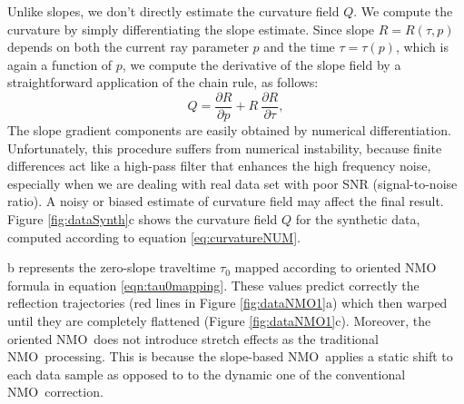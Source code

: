 Unlike slopes, we don't directly estimate the curvature field $Q$.  We
compute the curvature by simply differentiating the slope
estimate. Since slope $R=R(\tau ,p)$ depends on both the current ray
parameter $p$ and the time $\tau =\tau (p)$, which is again a function
of $p$, we compute the derivative of the slope field by a
straightforward application of the chain rule, as follows:
\begin{equation}
Q=\frac{\partial R}{\partial p}+R~\frac{\partial R}{\partial \tau},  \label{eq:curvatureNUM}
\end{equation}
The slope gradient components are easily obtained by numerical
differentiation.  Unfortunately, this procedure suffers from numerical
instability, because finite differences act like a high-pass filter
that enhances the high frequency noise, especially when we are dealing
with real data set with poor SNR (signal-to-noise
ratio).  A noisy or biased estimate of 
curvature field may affect the final result. Figure
\ref{fig:dataSynth}c shows the curvature field $Q$ for the synthetic
data, computed according to equation \ref{eq:curvatureNUM}.


b represents the zero-slope traveltime $\tau _{0}$
mapped according to  oriented NMO formula in equation
\ref{eqn:tau0mapping}. These values predict correctly the reflection
trajectories (red lines in Figure \ref{fig:dataNMO1}a) which 
then  warped until they are completely flattened (Figure
\ref{fig:dataNMO1}c). Moreover, the oriented NMO\ does not introduce
stretch effects as the traditional NMO\ processing. This is because
the slope-based NMO\ applies a  static shift to each data
sample as opposed to to the dynamic one of the conventional NMO\
correction.



